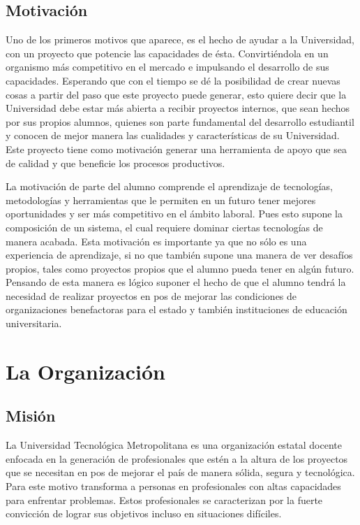 \documentclass[a4paper,12pt,openany,oneside]{book}
\begin{document}
\section{Motivación}
Uno de los primeros motivos que aparece, es el hecho de ayudar a la Universidad, con un proyecto que potencie las capacidades de ésta. Convirtiéndola en un organismo más competitivo en el mercado e impulsando el desarrollo de sus capacidades. Esperando que con el tiempo se dé la posibilidad de crear nuevas cosas a partir del paso que este proyecto puede generar, esto quiere decir que la Universidad debe estar más abierta a recibir proyectos internos, que sean hechos por sus propios alumnos, quienes son parte fundamental del desarrollo estudiantil y conocen de mejor manera las cualidades y características de su Universidad. Este proyecto tiene como motivación generar una herramienta de apoyo que sea de calidad y que beneficie los procesos productivos.

La motivación de parte del alumno comprende el aprendizaje de tecnologías, metodologías y herramientas que le permiten en un futuro tener mejores oportunidades y ser más competitivo en el ámbito laboral. Pues esto supone la composición de un sistema, el cual requiere dominar ciertas tecnologías de manera acabada. Esta motivación es importante ya que no sólo es una experiencia de aprendizaje, si no que también supone una manera de ver desafíos propios, tales como proyectos propios que el alumno pueda tener en algún futuro. Pensando de esta manera es lógico suponer el hecho de que el alumno tendrá la necesidad de realizar proyectos en pos de mejorar las condiciones de organizaciones benefactoras para el estado y también instituciones de educación universitaria.
\chapter{La Organización}
\thispagestyle{empty}
\section{Misión}
La Universidad Tecnológica Metropolitana es una organización estatal docente enfocada en la generación de profesionales que estén a la altura de los proyectos que se necesitan en pos de mejorar el país de manera sólida, segura y tecnológica. Para este motivo transforma a personas en profesionales con altas capacidades para enfrentar problemas. Estos profesionales se caracterizan por la fuerte convicción de lograr sus objetivos incluso en situaciones difíciles.
\end{document}
